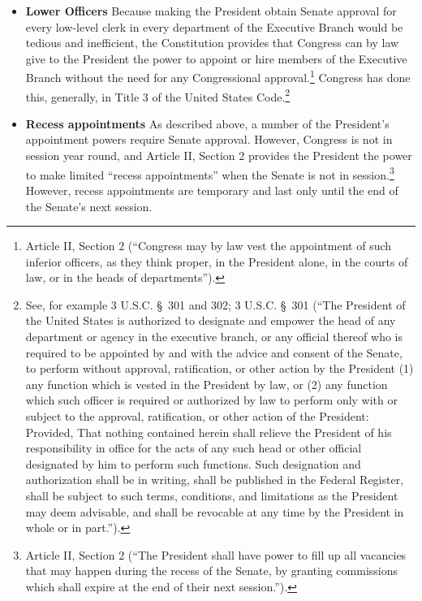 \begin{itemize}
\item \textbf{Lower Officers}
Because making the President obtain Senate approval for every low-level clerk in every department of the Executive Branch would be tedious and inefficient, the Constitution provides that Congress can by law give to the President the power to appoint or hire members of the Executive Branch without the need for any Congressional approval.\footnote{Article II, Section 2 (``Congress may by law vest the appointment of such inferior officers, as they think proper, in the President alone, in the courts of law, or in the heads of departments'').}  Congress has done this, generally, in Title 3 of the United States Code.\footnote{See, for example 3 U.S.C. \S\ 301 and 302; 3 U.S.C. \S\ 301 (``The President of the United States is authorized to designate and empower the head of any department or agency in the executive branch, or any official thereof who is required to be appointed by and with the advice and consent of the Senate, to perform without approval, ratification, or other action by the President (1) any function which is vested in the President by law, or (2) any function which such officer is required or authorized by law to perform only with or subject to the approval, ratification, or other action of the President: Provided, That nothing contained herein shall relieve the President of his responsibility in office for the acts of any such head or other official designated by him to perform such functions. Such designation and authorization shall be in writing, shall be published in the Federal Register, shall be subject to such terms, conditions, and limitations as the President may deem advisable, and shall be revocable at any time by the President in whole or in part.'').}

\item \textbf{Recess appointments}
As described above, a number of the President's appointment powers require Senate approval.
However, Congress is not in session year round, and Article II, Section 2 provides the President the power to make limited ``recess appointments'' when the Senate is not in session.\footnote{Article II, Section 2 (``The President shall have power to fill up all vacancies that may happen during the recess of the Senate, by granting commissions which shall expire at the end of their next session.'').}  However, recess appointments are temporary and last only until the end of the Senate's next session.

\end{itemize}

